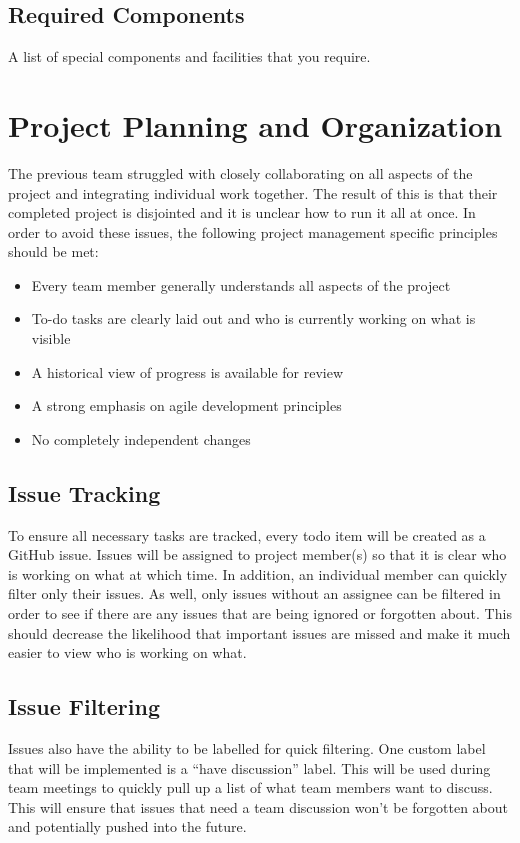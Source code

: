 \documentclass[12pt]{report}
\begin{document}
\subsection{Required Components}
A list of special components and facilities that you require.


\section{Project Planning and Organization}
The previous team struggled with closely collaborating on all aspects of the project and integrating individual work together. The result of this is that their completed project is disjointed and it is unclear how to run it all at once. In order to avoid these issues, the following project management specific principles should be met:
\begin{itemize}
\itemsep0em 
    \item Every team member generally understands all aspects of the project
    \item To-do tasks are clearly laid out and who is currently working on what is visible
    \item A historical view of progress is available for review
    \item A strong emphasis on agile development principles
    \item No completely independent changes
\end{itemize}
\subsection{Issue Tracking}
To ensure all necessary tasks are tracked, every todo item will be created as a GitHub issue. Issues will be assigned to project member(s) so that it is clear who is working on what at which time. In addition, an individual member can quickly filter only their issues. As well, only issues without an assignee can be filtered in order to see if there are any issues that are being ignored or forgotten about. This should decrease the likelihood that important issues are missed and make it much easier to view who is working on what.
\subsection{Issue Filtering}
Issues also have the ability to be labelled for quick filtering. One custom label that will be implemented is a “have discussion” label. This will be used during team meetings to quickly pull up a list of what team members want to discuss. This will ensure that issues that need a team discussion won’t be forgotten about and potentially pushed into the future.
\end{document}
